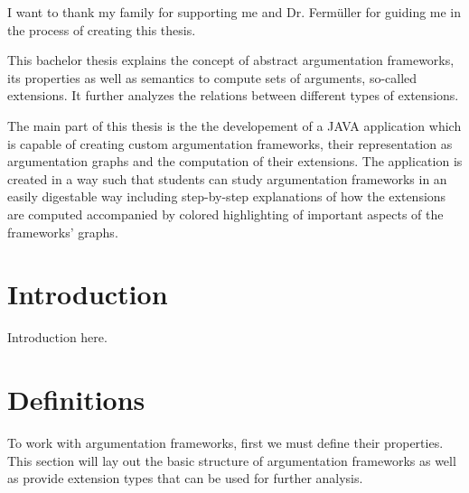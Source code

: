 \documentclass[draft,final]{vutinfth} %
\newcommand{\hl}{\par\vspace{6pt}} %
\newcommand{\cl}{\par\vspace{12pt}} %
\begin{document}
\frontmatter %

\addstatementpage

\begin{acknowledgements*}
I want to thank my family for supporting me and Dr. Ferm{\"u}ller for guiding me in the process of creating this thesis.
\end{acknowledgements*}

\begin{abstract*}
This bachelor thesis explains the concept of abstract argumentation frameworks, its properties as well as semantics to compute sets of arguments, so-called extensions. It further analyzes the relations between different types of extensions.\hl %
The main part of this thesis is the the developement of a JAVA application which is capable of creating custom argumentation frameworks, their representation as argumentation graphs and the computation of their extensions. The application is created in a way such that students can study argumentation frameworks in an easily digestable way including step-by-step explanations of how the extensions are computed accompanied by colored highlighting of important aspects of the frameworks' graphs.\\ %
\end{abstract*}


\tableofcontents* %

\mainmatter

\chapter{Introduction}
Introduction here.

\chapter{Definitions}

To work with argumentation frameworks, first we must define their properties. This section will lay out the basic structure of argumentation frameworks as well as provide extension types that can be used for further analysis.\cl
\end{document}
